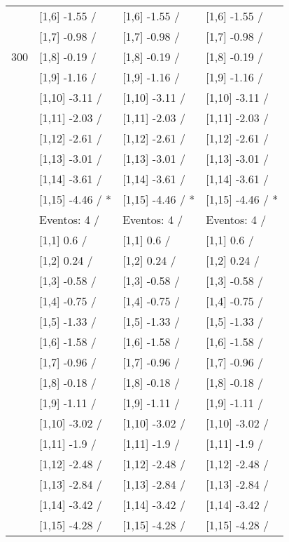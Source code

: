 \begin{table}
\begin{tabular}[t]{llll}
 & {}[1,6] -1.55  / & {}[1,6] -1.55  / & {}[1,6] -1.55  /\\
 & {}[1,7] -0.98  / & {}[1,7] -0.98  / & {}[1,7] -0.98  /\\
300 & {}[1,8] -0.19  / & {}[1,8] -0.19  / & {}[1,8] -0.19  /\\
\addlinespace
 & {}[1,9] -1.16  / & {}[1,9] -1.16  / & {}[1,9] -1.16  /\\
 & {}[1,10] -3.11  / & {}[1,10] -3.11  / & {}[1,10] -3.11  /\\
 & {}[1,11] -2.03  / & {}[1,11] -2.03  / & {}[1,11] -2.03  /\\
 & {}[1,12] -2.61  / & {}[1,12] -2.61  / & {}[1,12] -2.61  /\\
 & {}[1,13] -3.01  / & {}[1,13] -3.01  / & {}[1,13] -3.01  /\\
\addlinespace
 & {}[1,14] -3.61  / & {}[1,14] -3.61  / & {}[1,14] -3.61  /\\
 & {}[1,15] -4.46  / * & {}[1,15] -4.46  / * & {}[1,15] -4.46  / *\\
 & Eventos:  4 / & Eventos:  4 / & Eventos:  4 /\\
 & {}[1,1] 0.6  / & {}[1,1] 0.6  / & {}[1,1] 0.6  /\\
 & {}[1,2] 0.24  / & {}[1,2] 0.24  / & {}[1,2] 0.24  /\\
\addlinespace
 & {}[1,3] -0.58  / & {}[1,3] -0.58  / & {}[1,3] -0.58  /\\
 & {}[1,4] -0.75  / & {}[1,4] -0.75  / & {}[1,4] -0.75  /\\
 & {}[1,5] -1.33  / & {}[1,5] -1.33  / & {}[1,5] -1.33  /\\
 & {}[1,6] -1.58  / & {}[1,6] -1.58  / & {}[1,6] -1.58  /\\
 & {}[1,7] -0.96  / & {}[1,7] -0.96  / & {}[1,7] -0.96  /\\
\addlinespace
500 & {}[1,8] -0.18  / & {}[1,8] -0.18  / & {}[1,8] -0.18  /\\
 & {}[1,9] -1.11  / & {}[1,9] -1.11  / & {}[1,9] -1.11  /\\
 & {}[1,10] -3.02  / & {}[1,10] -3.02  / & {}[1,10] -3.02  /\\
 & {}[1,11] -1.9  / & {}[1,11] -1.9  / & {}[1,11] -1.9  /\\
 & {}[1,12] -2.48  / & {}[1,12] -2.48  / & {}[1,12] -2.48  /\\
\addlinespace
 & {}[1,13] -2.84  / & {}[1,13] -2.84  / & {}[1,13] -2.84  /\\
 & {}[1,14] -3.42  / & {}[1,14] -3.42  / & {}[1,14] -3.42  /\\
 & {}[1,15] -4.28  / & {}[1,15] -4.28  / & {}[1,15] -4.28  /\\
\bottomrule
\end{tabular}
\end{table}
